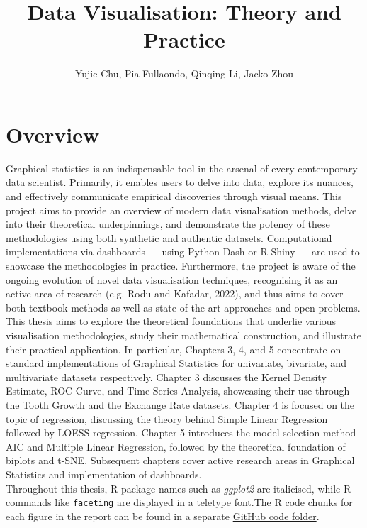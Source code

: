 \documentclass{article}\usepackage[]{graphicx}\usepackage[]{xcolor}
\title{Data Visualisation: Theory and Practice}
\author{Yujie Chu, Pia Fullaondo, Qinqing Li, Jacko Zhou}
\numberwithin{equation}{section}
\begin{document}
\maketitle 

\newpage
\tableofcontents

\newpage  %
\section*{Overview}

\noindent
Graphical statistics is an indispensable tool in the arsenal of every contemporary data scientist. Primarily, it enables users to delve into data, explore its nuances, and effectively communicate empirical discoveries through visual means. This project aims to provide an overview of modern data visualisation methods, delve into their theoretical underpinnings, and demonstrate the potency of these methodologies using both synthetic and authentic datasets. Computational implementations via dashboards — using Python Dash or R Shiny — are used to showcase the methodologies in practice. Furthermore, the project is aware of the ongoing evolution of novel data visualisation techniques, recognising it as an active area of research (e.g. Rodu and Kafadar, 2022), and thus aims to cover both textbook methods as well as state-of-the-art approaches and open problems.\\

\noindent
This thesis aims to explore the theoretical foundations that underlie various visualisation methodologies, study their mathematical construction, and illustrate their practical application. In particular, Chapters 3, 4, and 5 concentrate on standard implementations of Graphical Statistics for univariate, bivariate, and multivariate datasets respectively. Chapter 3 discusses the Kernel Density Estimate, ROC Curve, and Time Series Analysis, showcasing their use through the Tooth Growth and the Exchange Rate datasets. Chapter 4 is focused on the topic of regression, discussing the theory behind Simple Linear Regression followed by LOESS regression. Chapter 5 introduces the model selection method AIC and Multiple Linear Regression, followed by the theoretical foundation of biplots and t-SNE. Subsequent chapters cover active research areas in Graphical Statistics and implementation of dashboards. \\


\noindent
Throughout this thesis, R package names such as \textit{ggplot2} are italicised, while R commands like \texttt{faceting} are displayed in a teletype font.The R code chunks for each figure in the report can be found in a separate \href{https://github.com/Qinqing-Li/Data-Visualisation-Project/tree/main/code}{GitHub code folder}. \\
\end{document}
